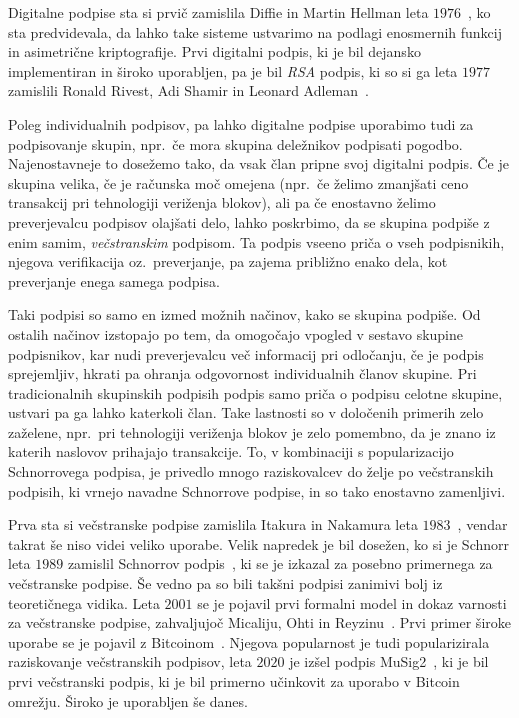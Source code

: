 \documentclass[isrm2, tisk]{fmfdelo}
\begin{document}
Digitalne podpise sta si prvič zamislila Diffie in Martin Hellman leta $1976$~\cite{diffie1976new},
ko sta predvidevala, da lahko take sisteme ustvarimo na podlagi enosmernih funkcij in asimetrične
kriptografije. Prvi digitalni podpis, ki je bil dejansko implementiran in široko uporabljen, pa je
bil \textit{RSA} podpis, ki so si ga leta $1977$ zamislili Ronald Rivest, Adi Shamir in Leonard
Adleman~\cite{rivest1978rsa}.

Poleg individualnih podpisov, pa lahko digitalne podpise uporabimo tudi za podpisovanje skupin, npr.\
če mora skupina deležnikov podpisati pogodbo. Najenostavneje to dosežemo tako, da vsak član pripne
svoj digitalni podpis. Če je skupina velika, če je računska moč omejena (npr.\ če želimo zmanjšati
ceno transakcij pri tehnologiji veriženja blokov), ali pa če enostavno želimo preverjevalcu podpisov
olajšati delo, lahko poskrbimo, da se skupina podpiše z enim samim, \textit{večstranskim} podpisom.
Ta podpis vseeno priča o vseh podpisnikih, njegova verifikacija oz.\ preverjanje, pa zajema približno
enako dela, kot preverjanje enega samega podpisa.

Taki podpisi so samo en izmed možnih načinov, kako se skupina podpiše. Od ostalih načinov izstopajo
po tem, da omogočajo vpogled v sestavo skupine podpisnikov, kar nudi preverjevalcu več informacij
pri odločanju, če je podpis sprejemljiv, hkrati pa ohranja odgovornost individualnih članov skupine.
Pri tradicionalnih skupinskih podpisih podpis samo priča o podpisu celotne skupine, ustvari pa ga
lahko katerkoli član. Take lastnosti so v določenih primerih zelo zaželene, npr.\ pri tehnologiji
veriženja blokov je zelo pomembno, da je znano iz katerih naslovov prihajajo transakcije. To, v
kombinaciji s popularizacijo Schnorrovega podpisa, je privedlo mnogo raziskovalcev do želje po
večstranskih podpisih, ki vrnejo navadne Schnorrove podpise, in so tako enostavno zamenljivi.

Prva sta si večstranske podpise zamislila Itakura in Nakamura leta $1983$~\cite{itakura1983multi},
vendar takrat še niso videi veliko uporabe. Velik napredek je bil dosežen, ko si je Schnorr leta
$1989$ zamislil Schnorrov podpis~\cite{schnorr1989sig}, ki se je izkazal za posebno primernega za
večstranske podpise. Še vedno pa so bili takšni podpisi zanimivi bolj iz teoretičnega vidika. Leta
$2001$ se je pojavil prvi formalni model in dokaz varnosti za večstranske podpise, zahvaljujoč
Micaliju, Ohti in Reyzinu~\cite{micali2001asm}. Prvi primer široke uporabe se je pojavil z
Bitcoinom~\cite{nakamoto2009bitcoin}. Njegova popularnost je tudi popularizirala raziskovanje
večstranskih podpisov, leta $2020$ je izšel podpis MuSig2~\cite{jonas2020musig2}, ki je bil prvi
večstranski podpis, ki je bil primerno učinkovit za uporabo v Bitcoin omrežju. Široko je uporabljen
še danes.
\end{document}
